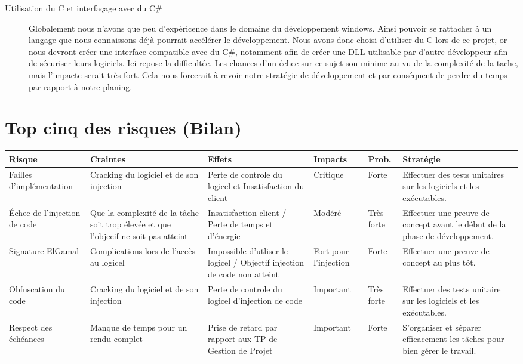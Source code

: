 \begin{description}
\item[Utilisation du C et interfaçage avec du C\#]
	Globalement nous n'avons que peu d'expéricence dans le domaine du développement windows. Ainsi pouvoir se rattacher à un langage que nous
	connaissons déjà pourrait accélérer le développement. Nous avons donc choisi d'utiliser du C lors de ce projet, or nous devront créer une 
	interface compatible avec du C\#, notamment afin de créer une DLL utilisable par d'autre développeur afin de sécuriser leurs logiciels.
	Ici repose la difficultée. Les chances d'un échec sur ce sujet son minime au vu de la complexité de la tache, mais l'impacte serait très fort.
	Cela nous forcerait à revoir notre stratégie de développement et par conséquent de perdre du temps par rapport à notre planing.

\end{description}

\chapter{Top cinq des risques (Bilan)}

\begin{table}[!h]
    \small
    \begin{tabular}{|m{2.5cm}|m{2.5cm}|m{2.5cm}|m{1.5cm}|m{1.5cm}|m{4cm}|} 
	\hline
	\textbf{Risque} & \textbf{Craintes} & \textbf{Effets} & \textbf{Impacts} & \textbf{Prob.} & \textbf{Stratégie}\\
	\hline
	Failles d'implémentation 
		& Cracking du logiciel et de son injection 
		& Perte de controle du logicel et Insatisfaction du client 
		& Critique 
		& Forte 
		& Effectuer des tests unitaires sur les logiciels et les exécutables.\\
	\hline
	Échec de l'injection de code 
		& Que la complexité de la tâche soit trop élevée et que l'objecif ne soit pas atteint 
		& Insatisfaction client / Perte de temps et d'énergie 
		& Modéré 
		& Très forte 
		& Effectuer une preuve de concept avant le début de la phase de développement.\\
	\hline
	Signature ElGamal 
		& Complications lors de l'accès au logicel 
		& Impossible d'utliser le logicel / Objectif injection de code non atteint 
		& Fort pour l'injection 
		& Forte 
		& Effectuer une preuve de concept au plus tôt.\\
	\hline
	Obfuscation du code 
		& Cracking du logiciel et de son injection 
		& Perte de controle du logicel d'injection de code 
		& Important 
		& Très forte 
		& Effectuer des tests unitaire sur les logiciels et les exécutables.\\
	\hline
	Respect des échéances 
		& Manque de temps pour un rendu complet 
		& Prise de retard par rapport aux TP de Gestion de Projet
		& Important 
		& Forte 
		& S’organiser et séparer efficacement les tâches pour bien gérer le travail.\\
	\hline	    
    \end{tabular}
\end{table}

